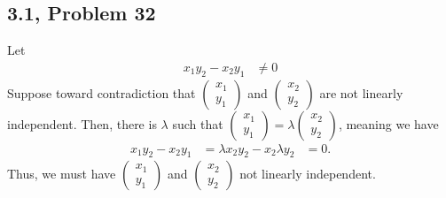\documentclass[10pt]{mypackage}
\begin{document}
\subsection{3.1, Problem 32}%
Let
\begin{align*}
  x_1y_2 - x_2y_1 &\neq 0
\end{align*}
Suppose toward contradiction that $ \begin{pmatrix}x_1\\y_1\end{pmatrix} $ and $ \begin{pmatrix}x_2\\y_2\end{pmatrix} $ are not linearly independent. Then, there is $\lambda$ such that $ \begin{pmatrix}x_1 \\ y_1\end{pmatrix} = \lambda \begin{pmatrix}x_2\\y_2\end{pmatrix} $, meaning we have
\begin{align*}
  x_1y_2 - x_2y_1 &= \lambda x_2y_2 - x_2\lambda y_2
                  &= 0.
\end{align*}
Thus, we must have $ \begin{pmatrix}x_1\\y_1\end{pmatrix} $ and $ \begin{pmatrix}x_2\\y_2\end{pmatrix} $ not linearly independent.
\end{document}
